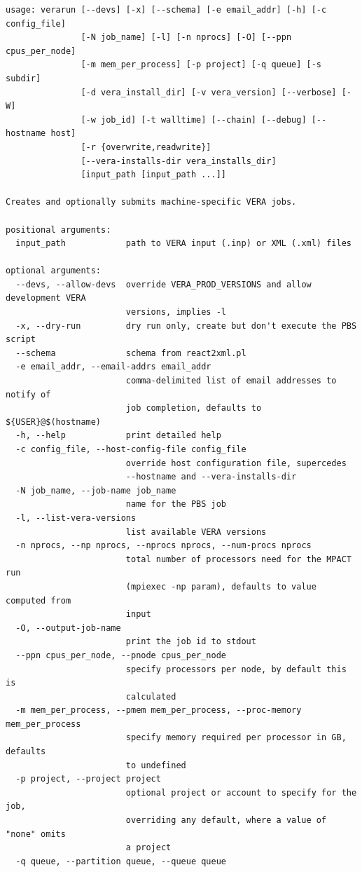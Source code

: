 \documentclass{vera-ornltm}
\begin{document}
\begin{verbatim}
usage: verarun [--devs] [-x] [--schema] [-e email_addr] [-h] [-c config_file]
               [-N job_name] [-l] [-n nprocs] [-O] [--ppn cpus_per_node]
               [-m mem_per_process] [-p project] [-q queue] [-s subdir]
               [-d vera_install_dir] [-v vera_version] [--verbose] [-W]
               [-w job_id] [-t walltime] [--chain] [--debug] [--hostname host]
               [-r {overwrite,readwrite}]
               [--vera-installs-dir vera_installs_dir]
               [input_path [input_path ...]]

Creates and optionally submits machine-specific VERA jobs.

positional arguments:
  input_path            path to VERA input (.inp) or XML (.xml) files

optional arguments:
  --devs, --allow-devs  override VERA_PROD_VERSIONS and allow development VERA
                        versions, implies -l
  -x, --dry-run         dry run only, create but don't execute the PBS script
  --schema              schema from react2xml.pl
  -e email_addr, --email-addrs email_addr
                        comma-delimited list of email addresses to notify of
                        job completion, defaults to ${USER}@$(hostname)
  -h, --help            print detailed help
  -c config_file, --host-config-file config_file
                        override host configuration file, supercedes
                        --hostname and --vera-installs-dir
  -N job_name, --job-name job_name
                        name for the PBS job
  -l, --list-vera-versions
                        list available VERA versions
  -n nprocs, --np nprocs, --nprocs nprocs, --num-procs nprocs
                        total number of processors need for the MPACT run
                        (mpiexec -np param), defaults to value computed from
                        input
  -O, --output-job-name
                        print the job id to stdout
  --ppn cpus_per_node, --pnode cpus_per_node
                        specify processors per node, by default this is
                        calculated
  -m mem_per_process, --pmem mem_per_process, --proc-memory mem_per_process
                        specify memory required per processor in GB, defaults
                        to undefined
  -p project, --project project
                        optional project or account to specify for the job,
                        overriding any default, where a value of "none" omits
                        a project
  -q queue, --partition queue, --queue queue

\end{verbatim}
\end{document}

